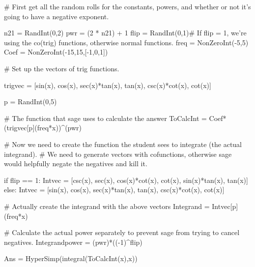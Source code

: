 \begin{sagesilent}
# First get all the random rolls for the constants, powers, and whether or not it's going to have a negative exponent.

n21 = RandInt(0,2)
pwr = (2 * n21) + 1
flip = RandInt(0,1)# If flip = 1, we're using the co(trig) functions, otherwise normal functions.
freq = NonZeroInt(-5,5)
Coef = NonZeroInt(-15,15,[-1,0,1])

# Set up the vectors of trig functions.

trigvec = [sin(x), cos(x), sec(x)*tan(x), tan(x), csc(x)*cot(x), cot(x)]

p = RandInt(0,5)

# The function that sage uses to calculate the answer
ToCalcInt = Coef*(trigvec[p](freq*x))^(pwr)

# Now we need to create the function the student sees to integrate (the actual integrand). 
# We need to generate vectors with cofunctions, otherwise sage would helpfully negate the negatives and kill it.

if flip == 1:
    Intvec = [csc(x), sec(x), cos(x)*cot(x), cot(x), sin(x)*tan(x), tan(x)]
else:
    Intvec = [sin(x), cos(x), sec(x)*tan(x), tan(x), csc(x)*cot(x), cot(x)]

# Actually create the integrand with the above vectors
Integrand = Intvec[p](freq*x)

# Calculate the actual power separately to prevent sage from trying to cancel negatives.
Integrandpower = (pwr)*((-1)^flip)

Ans = HyperSimp(integral(ToCalcInt(x),x))
\end{sagesilent}



